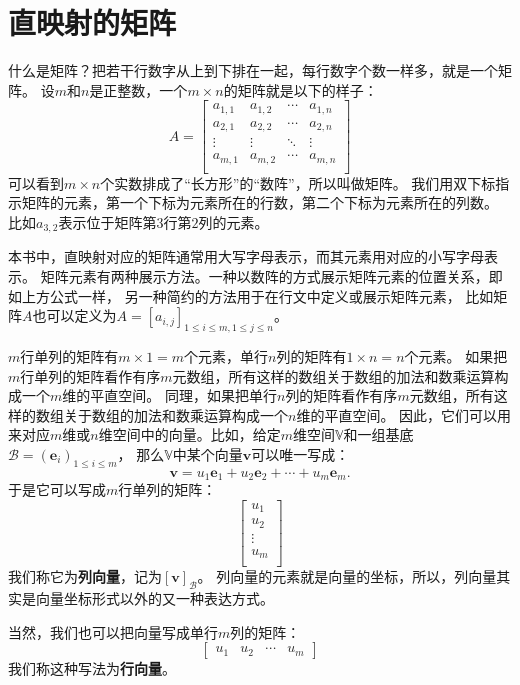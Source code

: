 \documentclass[12pt,UTF8]{ctexbook}
\begin{document}
\section{直映射的矩阵} 

什么是矩阵？把若干行数字从上到下排在一起，每行数字个数一样多，就是一个矩阵。
设$m$和$n$是正整数，一个$m\times n$的矩阵就是以下的样子：
$$
A = \left[
\begin{matrix}
 a_{1,1}     & a_{1,2}   & \cdots & a_{1,n} \\
 a_{2,1}     & a_{2,2}   & \cdots & a_{2,n} \\
 \vdots      & \vdots    & \ddots & \vdots  \\
 a_{m,1}     & a_{m,2}   & \cdots & a_{m,n} \\
\end{matrix}
\right]
$$
可以看到$m\times n$个实数排成了“长方形”的“数阵”，所以叫做矩阵。
我们用双下标指示矩阵的元素，第一个下标为元素所在的行数，第二个下标为元素所在的列数。
比如$a_{3,2}$表示位于矩阵第$3$行第$2$列的元素。

本书中，直映射对应的矩阵通常用大写字母表示，而其元素用对应的小写字母表示。
矩阵元素有两种展示方法。一种以数阵的方式展示矩阵元素的位置关系，即如上方公式一样，
另一种简约的方法用于在行文中定义或展示矩阵元素，
比如矩阵$A$也可以定义为$A = [a_{i,j}]_{1\leqslant i\leqslant m, 1\leqslant j\leqslant n}$。

$m$行单列的矩阵有$m \times 1 = m$个元素，单行$n$列的矩阵有$1 \times n = n$个元素。
如果把$m$行单列的矩阵看作有序$m$元数组，所有这样的数组关于数组的加法和数乘运算构成一个$m$维的平直空间。
同理，如果把单行$n$列的矩阵看作有序$m$元数组，所有这样的数组关于数组的加法和数乘运算构成一个$n$维的平直空间。
因此，它们可以用来对应$m$维或$n$维空间中的向量。比如，给定$m$维空间$\mathbb{V}$和一组基底$\mathcal{B} = \left(\mathbf{e}_i\right)_{1\leqslant i\leqslant m}$，
那么$\mathbb{V}$中某个向量$\mathbf{v}$可以唯一写成：
$$ \mathbf{v} = u_1\mathbf{e}_1 + u_2\mathbf{e}_2 + \cdots + u_m\mathbf{e}_m.$$
于是它可以写成$m$行单列的矩阵：
$$
\begin{bmatrix}
    u_{1} \\
    u_{2} \\
    \vdots  \\
    u_{m}  \\
   \end{bmatrix}
$$
我们称它为\textbf{列向量}，记为$[\mathbf{v}]_{\mathcal{B}}$。
列向量的元素就是向量的坐标，所以，列向量其实是向量坐标形式以外的又一种表达方式。

当然，我们也可以把向量写成单行$m$列的矩阵：
$$
\begin{bmatrix}
    u_{1} & u_{2} &\cdots & u_{m}
   \end{bmatrix}
$$
我们称这种写法为\textbf{行向量}。
\end{document}
